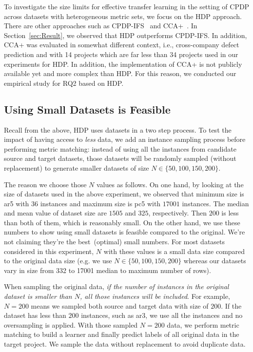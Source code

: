 To investigate the size limits for effective transfer learning in the setting of CPDP across datasets with heterogeneous metric sets, we focus on the HDP approach. There are other approaches such as CPDP-IFS~\cite{He14} and CCA+~\cite{Jing15}. In Section~\ref{sec:Result}, we observed that HDP outperforms CPDP-IFS. In addition, CCA+ was evaluated in somewhat different context, i.e., cross-company defect prediction and with 14 projects which are far less than 34 projects used in our experiments for HDP. In addition, the implementation of CCA+ is not publicly available yet and more complex than HDP. For this reason, we conducted our empirical study for RQ2 based on HDP.



 
\subsection{Using Small Datasets is Feasible}

Recall from the above,
HDP uses  datasets  in a two step process.
To test the impact of having access to {\em less} data,
we  add an instance sampling process before performing metric matching:
instead of using all the instances from
candidate source and target datasets, those datasets will
be randomly sampled (without replacement) to generate smaller datasets of
size $N \in \{50, 100, 150, 200\}$. 

The reason we choose those $N$ values as follows. On one hand, by looking at the size of datasets used in the
above experiment, we observed that minimum size is ar5 with $36$ instances and maximum size is pc5 with $17001$ instances.
The median and mean value of dataset size are $1505$ and $325$, respectively. Then $200$ is less than both of 
them, which is reasonably small.
On the other hand, we use these numbers to show using small datasets is feasible compared to
the original. We're not claiming they're the best~(optimal) small numbers. For most datasets considered in this experiment, $N$ with these values is a 
small data size compared to the original data size (e.g. we use $N \in \{50, 100, 150, 200\}$ whereas our datasets vary in size from 332 to 17001  median
to maximum number of rows).

When sampling the original data, {\it if
the number of instances in the original dataset is
smaller than $N$, all those instances will be
included}. For example, $N=200$ means we sampled both source and target data with size of $200$. If the dataset has less than $200$ instances, such as ar3, we use all
the instances and no oversampling is applied. With those sampled $N=200$ data, we perform metric matching to build a learner
and finally predict labels of all original data in the target project. We sample the data without replacement
to avoid duplicate data.

